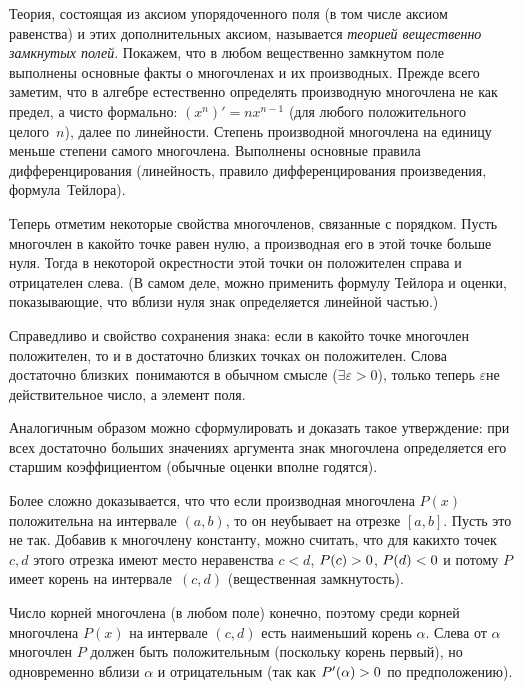 Теория, состоящая из аксиом упорядоченного поля (в том числе
аксиом равенства) и этих дополнительных аксиом, называется
\emph{теорией вещественно замкнутых полей}.%
Покажем, что в любом вещественно замкнутом поле
выполнены основные факты о многочленах и их производных. Прежде
всего заметим, что в алгебре естественно определять производную
многочлена не как предел, а чисто формально: $(x^n)'=nx^{n-1}$
(для любого положительного целого~$n$), далее по линейности.
Степень производной многочлена на единицу меньше степени самого
многочлена. Выполнены основные правила дифференцирования
(линейность, правило дифференцирования произведения,
формула~Тейлора).%

Теперь отметим некоторые свойства многочленов, связанные с
порядком. Пусть многочлен в какой\д то точке равен нулю, а
производная его в этой точке больше нуля. Тогда в некоторой
окрестности этой точки он положителен справа и отрицателен
слева. (В самом деле, можно применить формулу Тейлора и
оценки, показывающие, что вблизи нуля знак определяется
линейной частью.)

Справедливо и свойство сохранения знака: если в какой\д то точке
многочлен положителен, то и в достаточно близких точках он
положителен. Слова  достаточно близких\ понимаются в
обычном смысле ($\exists \varepsilon > 0$), только теперь
$\varepsilon$\т не действительное число, а элемент поля.

Аналогичным образом можно сформулировать и доказать такое
утверждение: при всех достаточно больших значениях аргумента
знак многочлена определяется его старшим коэффициентом (обычные
оценки вполне годятся).

Более сложно доказывается, что что если производная многочлена
$P(x)$ положительна на интервале $(a,b)$, то он неубывает на
отрезке $[a,b]$. Пусть это не так. Добавив к многочлену
константу, можно считать, что для каких\д то точек $c,d$ этого
отрезка имеют место неравенства $c<d$, $P(c)\hm>0$,
$P(d)\hm<0$ и потому $P$ имеет корень на интервале~$(c,d)$
(вещественная замкнутость).

Число корней многочлена (в любом поле) конечно, поэтому среди
корней многочлена $P(x)$ на интервале $(c,d)$ есть наименьший
корень $\alpha$. Слева от $\alpha$ многочлен $P$ должен быть
положительным (поскольку корень первый), но одновременно вблизи
$\alpha$ и отрицательным (так как $P'(\alpha)\hm>0$ по
предположению).

